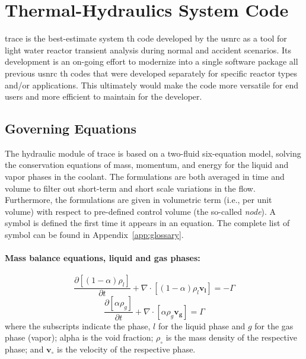 \section{Thermal-Hydraulics System Code }\label{sec:reflood_trace}

\gls{trace} is the best-estimate system \gls{th} code developed by the \gls{usnrc} 
as a tool for light water reactor transient analysis during normal and accident scenarios.
Its development is an on-going effort 
to modernize into a single software package all previous \gls{usnrc} \gls{th} codes
that were developed separately for specific reactor types and/or applications.
This ultimately would make the code more versatile for end users and more efficient to maintain for the developer.

\subsection{Governing Equations}\label{sub:governing_equations}

The hydraulic module of \gls{trace} is based on a two-fluid six-equation model, 
solving the conservation equations of mass, momentum, and energy for the liquid and vapor phases in the coolant.
The formulations are both averaged in time and volume to filter out short-term and short scale variations in the flow.
Furthermore, the formulations are given in volumetric term (i.e., per unit volume) with respect to pre-defined control volume (the so-called \emph{node}).
A symbol is defined the first time it appears in an equation.
The complete list of symbol can be found in Appendix~\ref{app:glossary}.

\paragraph{Mass balance equations, liquid and gas phases:}
\begin{equation}
	\frac{\partial [(1-\alpha)\rho_l]}{\partial t} + \nabla \cdot [(1-\alpha) \rho_l \mathbf{v_l}] = - \Gamma
\label{eq:mass_balance_liquid}
\end{equation}
\begin{equation}
	\frac{\partial [\alpha \rho_g]}{\partial t} + \nabla \cdot [\alpha \rho_g \mathbf{v_g}] = \Gamma
\label{eq:mass_balance_gas}
\end{equation}
where the subscripts indicate the phase, $l$ for the liquid phase and $g$ for the gas phase (vapor); 
\gls{alpha} is the void fraction; 
$\rho_\circ$ is the mass density of the respective phase;
and $\mathbf{v}_\circ$ is the velocity of the respective phase.

